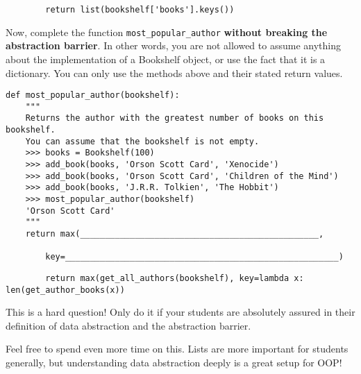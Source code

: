 \begin{solution}
    \begin{lstlisting}
        return list(bookshelf['books'].keys())
    \end{lstlisting}
\end{solution}

\begin{blocksection}
Now, complete the function \lstinline{most_popular_author} \textbf{without breaking the abstraction barrier}.
In other words, you are not allowed to assume anything about the implementation of a Bookshelf object, or
use the fact that it is a dictionary. You can only use the methods above and their stated return values.

\begin{lstlisting}
def most_popular_author(bookshelf):
    """
    Returns the author with the greatest number of books on this bookshelf.
    You can assume that the bookshelf is not empty.
    >>> books = Bookshelf(100)
    >>> add_book(books, 'Orson Scott Card', 'Xenocide')
    >>> add_book(books, 'Orson Scott Card', 'Children of the Mind')
    >>> add_book(books, 'J.R.R. Tolkien', 'The Hobbit')
    >>> most_popular_author(bookshelf)
    'Orson Scott Card'
    """
    return max(________________________________________________, 
        
        key=_______________________________________________________)
\end{lstlisting}
\end{blocksection}

\begin{solution}
    \begin{lstlisting}
        return max(get_all_authors(bookshelf), key=lambda x: len(get_author_books(x))
    \end{lstlisting}
\end{solution}

\begin{questionmeta}
    This is a hard question! Only do it if your students are absolutely assured in their definition of data abstraction and the abstraction barrier.

    Feel free to spend even more time on this. Lists are more important for students generally, but understanding data abstraction deeply is a great setup for OOP!
\end{questionmeta}
